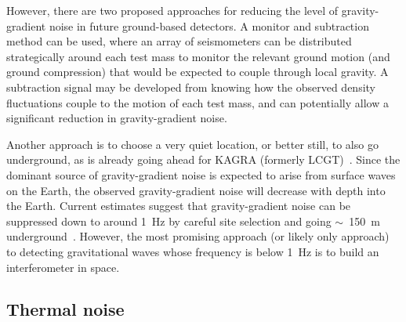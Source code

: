 However, there are two proposed approaches for reducing the level of gravity-gradient noise in future ground-based detectors. A monitor and subtraction
method can be used, where an array of seismometers can be distributed
strategically around each test mass to monitor the relevant ground motion (and
ground compression) that would be expected to couple through local gravity. A
subtraction signal may be developed from knowing how the observed density
fluctuations couple to the motion of each test mass, and can potentially allow a
significant reduction in gravity-gradient noise.


Another approach is to choose a very quiet location, or better still, to also go
underground, as is already going ahead for KAGRA (formerly LCGT)~\cite{Miyoki:2005}. Since the
dominant source of gravity-gradient noise is expected to arise from surface
waves on the Earth, the observed gravity-gradient noise will decrease with depth
into the Earth. Current estimates suggest that gravity-gradient noise can be
suppressed down to around 1~Hz by careful site selection and going $\sim$~150~m
underground~\cite{Beker:2011}. However, the most promising approach (or likely only
approach) to detecting gravitational waves whose frequency is below 1~Hz is to
build an interferometer in space.


\subsection{Thermal noise}
\label{subsection:thermal} 

